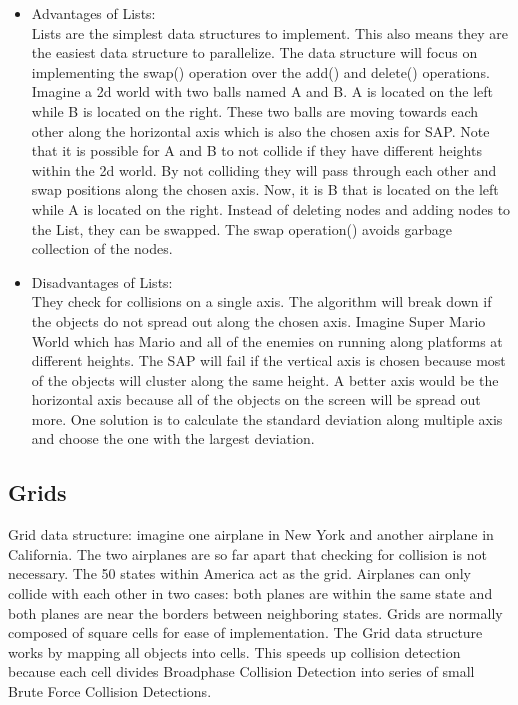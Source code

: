 \documentclass[conference]{IEEEtran}
\begin{document}
\begin{itemize}
  \item Advantages of Lists:\\
  Lists are the simplest data structures to implement. This also means they are the easiest data structure to parallelize. The data structure will focus on implementing the swap() operation over the add() and delete() operations. Imagine a 2d world with two balls named A and B. A is located on the left while B is located on the right. These two balls are moving towards each other along the horizontal axis which is also the chosen axis for SAP. Note that it is possible for A and B to not collide if they have different heights within the 2d world. By not colliding they will pass through each other and swap positions along the chosen axis. Now, it is B that is located on the left while A is located on the right. Instead of deleting nodes and adding nodes to the List, they can be swapped. The swap operation() avoids garbage collection of the nodes.\\
  
  \item Disadvantages of Lists:\\
  They check for collisions on a single axis. The algorithm will break down if the objects do not spread out along the chosen axis. Imagine Super Mario World which has Mario and all of the enemies on running along platforms at different heights. The SAP will fail if the vertical axis is chosen because most of the objects will cluster along the same height. A better axis would be the horizontal axis because all of the objects on the screen will be spread out more. One solution is to calculate the standard deviation along multiple axis and choose the one with the largest deviation.
\end{itemize}

	\subsection{Grids}
	Grid data structure: imagine one airplane in New York and another airplane in California. The two airplanes are so far apart that checking for collision is not necessary. The 50 states within America act as the grid. Airplanes can only collide with each other in two cases: both planes are within the same state and both planes are near the borders between neighboring states. Grids are normally composed of square cells for ease of implementation. The Grid data structure works by mapping all objects into cells. This speeds up collision detection because each cell divides Broadphase Collision Detection into series of small Brute Force Collision Detections.\\
	
\end{document}
